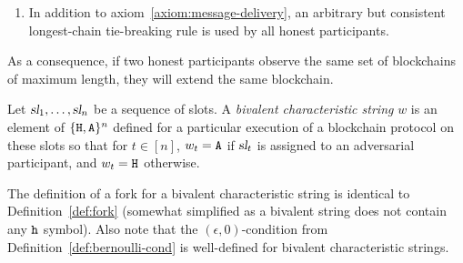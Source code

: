   \begin{enumerate}[label={\textbf{A\arabic*}\ensuremath{^\prime}}., ref={\textbf{A\arabic*}\ensuremath{^\prime}}, start=0]
  \item\label{axiom:tie-breaking} 
    In addition to axiom~\ref{axiom:message-delivery},  
    an arbitrary but consistent 
    longest-chain tie-breaking rule 
    is used by all honest participants.
  \end{enumerate}
  As a consequence, 
  if two honest participants observe 
  the same set of blockchains of maximum length, 
  they will extend the same blockchain.



  \begin{definition}\label{def:bivalent-char-string}
    Let $\textsl{sl}_1, \ldots, \textsl{sl}_{n}$ be a sequence of slots. 
    A \emph{bivalent characteristic string} $w$ 
    is an element of $\{\mathtt{H},\mathtt{A}\}^n$ 
    defined for a particular execution of a blockchain protocol on these slots so that 
    for $t \in [n]$, 
    $w_t = \mathtt{A}$ if $\textsl{sl}_{t}$ is assigned to an adversarial participant, 
    and $w_t = \mathtt{H}$ otherwise.
  \end{definition}
  The definition of a fork for a bivalent characteristic string is
  identical to Definition~\ref{def:fork} (somewhat simplified as a
  bivalent string does not contain any $\mathtt{h}$ symbol).
  Also note that the $(\epsilon, 0)$-condition 
  from Definition~\ref{def:bernoulli-cond} 
  is well-defined for bivalent characteristic strings.

